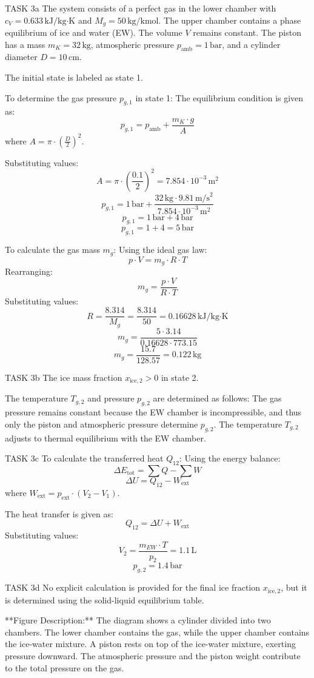 TASK 3a  
The system consists of a perfect gas in the lower chamber with \( c_V = 0.633 \, \text{kJ/kg·K} \) and \( M_g = 50 \, \text{kg/kmol} \). The upper chamber contains a phase equilibrium of ice and water (EW). The volume \( V \) remains constant. The piston has a mass \( m_K = 32 \, \text{kg} \), atmospheric pressure \( p_{\text{amb}} = 1 \, \text{bar} \), and a cylinder diameter \( D = 10 \, \text{cm} \).  

The initial state is labeled as state 1.  

To determine the gas pressure \( p_{g,1} \) in state 1:  
The equilibrium condition is given as:  
\[
p_{g,1} = p_{\text{amb}} + \frac{m_K \cdot g}{A}
\]  
where \( A = \pi \cdot \left(\frac{D}{2}\right)^2 \).  

Substituting values:  
\[
A = \pi \cdot \left(\frac{0.1}{2}\right)^2 = 7.854 \cdot 10^{-3} \, \text{m}^2
\]  
\[
p_{g,1} = 1 \, \text{bar} + \frac{32 \, \text{kg} \cdot 9.81 \, \text{m/s}^2}{7.854 \cdot 10^{-3} \, \text{m}^2}
\]  
\[
p_{g,1} = 1 \, \text{bar} + 4 \, \text{bar}
\]  
\[
p_{g,1} = 1 + 4 = 5 \, \text{bar}
\]  

To calculate the gas mass \( m_g \):  
Using the ideal gas law:  
\[
p \cdot V = m_g \cdot R \cdot T
\]  
Rearranging:  
\[
m_g = \frac{p \cdot V}{R \cdot T}
\]  
Substituting values:  
\[
R = \frac{8.314}{M_g} = \frac{8.314}{50} = 0.16628 \, \text{kJ/kg·K}
\]  
\[
m_g = \frac{5 \cdot 3.14}{0.16628 \cdot 773.15}
\]  
\[
m_g = \frac{15.7}{128.57} = 0.122 \, \text{kg}
\]  

TASK 3b  
The ice mass fraction \( x_{\text{ice},2} > 0 \) in state 2.  

The temperature \( T_{g,2} \) and pressure \( p_{g,2} \) are determined as follows:  
The gas pressure remains constant because the EW chamber is incompressible, and thus only the piston and atmospheric pressure determine \( p_{g,2} \).  
The temperature \( T_{g,2} \) adjusts to thermal equilibrium with the EW chamber.  

TASK 3c  
To calculate the transferred heat \( Q_{12} \):  
Using the energy balance:  
\[
\Delta E_{\text{tot}} = \sum Q - \sum W
\]  
\[
\Delta U = Q_{12} - W_{\text{ext}}
\]  
where \( W_{\text{ext}} = p_{\text{ext}} \cdot (V_2 - V_1) \).  

The heat transfer is given as:  
\[
Q_{12} = \Delta U + W_{\text{ext}}
\]  
Substituting values:  
\[
V_2 = \frac{m_{EW} \cdot T}{p_2} = 1.1 \, \text{L}
\]  
\[
p_{g,2} = 1.4 \, \text{bar}
\]  

TASK 3d  
No explicit calculation is provided for the final ice fraction \( x_{\text{ice},2} \), but it is determined using the solid-liquid equilibrium table.  

**Figure Description:**  
The diagram shows a cylinder divided into two chambers. The lower chamber contains the gas, while the upper chamber contains the ice-water mixture. A piston rests on top of the ice-water mixture, exerting pressure downward. The atmospheric pressure and the piston weight contribute to the total pressure on the gas.